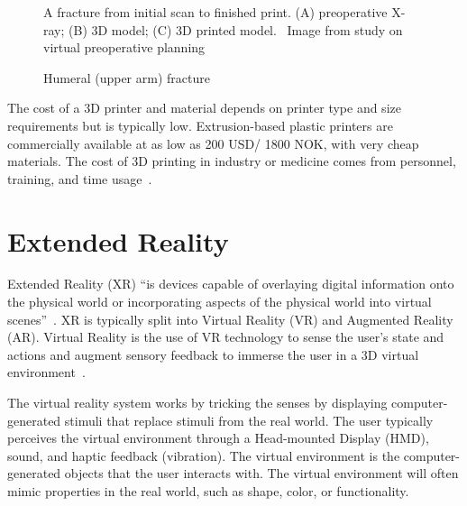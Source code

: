 \documentclass[a4paper]{report}
\begin{document}
\begin{figure}[h!]
    \centering
	\hfill
  \caption{Humeral (upper arm) fracture}
  \label{3dprint}
  \small
    A fracture from initial scan to finished print. (A) preoperative X-ray; (B) 3D model; (C) 3D printed model.
~Image from study on virtual preoperative planning~~\cite{mishra_virtual_2019}
\end{figure}
The cost of a 3D printer and material depends on printer type and size requirements but is typically low. Extrusion-based plastic printers are commercially available at as low as 200 USD/ 1800 NOK, with very cheap materials. The cost of 3D printing in industry or medicine comes from personnel, training, and time usage~\cite{shahrubudin_overview_2019}.

\section{Extended Reality}


Extended Reality (XR) \enquote{is devices capable of overlaying digital information onto the physical world or incorporating aspects of the physical world into virtual scenes}~\cite{andrews_extended_2019}.
XR is typically split into Virtual Reality (VR) and Augmented Reality (AR).
Virtual Reality is the use of VR technology to sense the user's state and actions and augment sensory feedback to immerse the user in a 3D virtual environment~\cite{mihelj_virtual_2014}.

The virtual reality system works by tricking the senses by displaying computer-generated stimuli that replace stimuli from the real world. 
The user typically perceives the virtual environment through a Head-mounted Display (HMD), sound, and haptic feedback (vibration).
The virtual environment is the computer-generated objects that the user interacts with. The virtual environment will often mimic properties in the real world, such as shape, color, or functionality.
\end{document}
